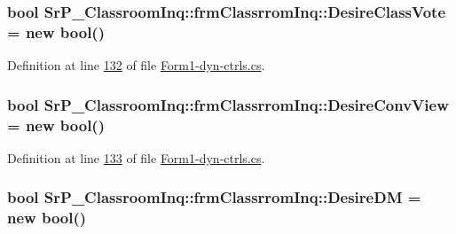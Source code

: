 \hypertarget{class_sr_p___classroom_inq_1_1frm_classrrom_inq_af51d439b56b35a3b7d8fdaa6bb5252cd}{
\subsubsection[{\-Desire\-Class\-Vote}]{\setlength{\rightskip}{0pt plus 5cm}bool {\bf \-Sr\-P\-\_\-\-Classroom\-Inq\-::frm\-Classrrom\-Inq\-::\-Desire\-Class\-Vote} = new bool()}}
\label{class_sr_p___classroom_inq_1_1frm_classrrom_inq_af51d439b56b35a3b7d8fdaa6bb5252cd}


\-Definition at line \hyperlink{_form1-dyn-ctrls_8cs_source_l00132}{132} of file \hyperlink{_form1-dyn-ctrls_8cs_source}{\-Form1-\/dyn-\/ctrls.\-cs}.

\hypertarget{class_sr_p___classroom_inq_1_1frm_classrrom_inq_a3bd81e817c525b0cf0f1a0ae53e527d3}{
\subsubsection[{\-Desire\-Conv\-View}]{\setlength{\rightskip}{0pt plus 5cm}bool {\bf \-Sr\-P\-\_\-\-Classroom\-Inq\-::frm\-Classrrom\-Inq\-::\-Desire\-Conv\-View} = new bool()}}
\label{class_sr_p___classroom_inq_1_1frm_classrrom_inq_a3bd81e817c525b0cf0f1a0ae53e527d3}


\-Definition at line \hyperlink{_form1-dyn-ctrls_8cs_source_l00133}{133} of file \hyperlink{_form1-dyn-ctrls_8cs_source}{\-Form1-\/dyn-\/ctrls.\-cs}.

\hypertarget{class_sr_p___classroom_inq_1_1frm_classrrom_inq_a8f8f9bb905b290fa448b445560458f89}{
\subsubsection[{\-Desire\-D\-M}]{\setlength{\rightskip}{0pt plus 5cm}bool {\bf \-Sr\-P\-\_\-\-Classroom\-Inq\-::frm\-Classrrom\-Inq\-::\-Desire\-D\-M} = new bool()}}
\label{class_sr_p___classroom_inq_1_1frm_classrrom_inq_a8f8f9bb905b290fa448b445560458f89}



